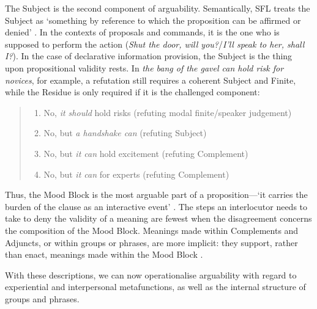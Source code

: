 		The Subject is the second component of arguability. Semantically, SFL treats the Subject as `something by reference to which the proposition can be affirmed or denied' \cite[p.~117]{halliday_introduction_2004}. In the contexts of proposals and commands, it is the one who is supposed to perform the action (\emph{Shut the door, will you?}/\emph{I'll speak to her, shall I?}). In the case of declarative information provision, the Subject is the thing upon propositional validity rests. In \emph{the bang of the gavel can hold risk for novices}, for example, a refutation still requires a coherent Subject and Finite, while the Residue is only required if it is the challenged component:

\begin{quote}
\small
\begin{enumerate}	\setlength\itemsep{-0.5em}
		\item No, \emph{it should} hold risks (refuting modal finite/speaker judgement)
		\item No, but \emph{a handshake can} (refuting Subject)
		\item No, but \emph{it can} hold excitement (refuting Complement)
		\item No, but \emph{it can} for experts (refuting Complement)
\end{enumerate}
\end{quote}
		Thus, the Mood Block is the most arguable part of a proposition---`it carries the burden of the clause as an interactive event' \cite[p.~118]{halliday_introduction_2004}. The steps an interlocutor needs to take to deny the validity of a meaning are fewest when the disagreement concerns the composition of the Mood Block. Meanings made within Complements and Adjuncts, or within groups or phrases, are more implicit: they support, rather than enact, meanings made within the Mood Block \cite{matthiessen_combining_2002}.


		With these descriptions, we can now operationalise arguability with regard to experiential and interpersonal metafunctions, as well as the internal structure of groups and phrases.

